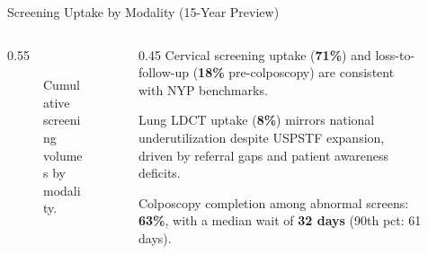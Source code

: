 \documentclass[final]{beamer}
\newlength{\sepwidth}
\newlength{\colwidth}
\newcommand{\separatorcolumn}{\begin{column}{\sepwidth}\end{column}}
\begin{document}
\begin{frame}[t]
\begin{columns}[t]
\begin{column}{\colwidth}
\begin{block}{Screening Uptake by Modality (15-Year Preview)}
\begin{columns}
\begin{column}{0.55\textwidth}
\begin{center}
      \begin{figure}
      \caption{Cumulative screening volumes by modality.}
    \end{figure}
   \end{center}
\end{column}
\begin{column}{0.45\textwidth}
    Cervical screening uptake (\textbf{71\%}) and loss-to-follow-up
    (\textbf{18\%} pre-colposcopy) are consistent with NYP benchmarks.

    \vspace{0.8em}
    Lung LDCT uptake (\textbf{8\%}) mirrors national underutilization
    despite USPSTF expansion, driven by referral gaps and patient
    awareness deficits.

    \vspace{0.8em}
    Colposcopy completion among abnormal screens: \textbf{63\%},
    with a median wait of \textbf{32 days} (90th pct: 61 days).
\end{column}
\end{columns}

  \end{block}

\end{column}

\separatorcolumn


\begin{column}{\colwidth}


\end{column}
\end{columns}
\end{frame}
\end{document}
